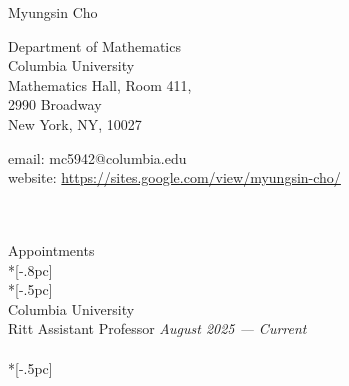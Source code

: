 \documentclass{article}
\begin{document}
\begin{center}
{\LARGE Myungsin Cho} \\[2pc]
\end{center}
\begin{minipage}[c]{0.4\linewidth}
Department of Mathematics\\ 
Columbia University\\
Mathematics Hall, Room 411, \\ 2990 Broadway \\
New York, NY, 10027
\end{minipage} %
\begin{minipage}[c]{0.6\linewidth}
email:  mc5942@columbia.edu \\
website: \url{https://sites.google.com/view/myungsin-cho/} \\
\\
\end{minipage}  \\[.5pc]

{\Large  Appointments} \\*[-.8pc]
\underline{\hspace{6.5in}} \\*[-.5pc]
\\
{ Columbia University}\\ 
{Ritt Assistant Professor} \hfill {\it  August 2025 — Current} \\
\\*[-.5pc]
\end{document}
